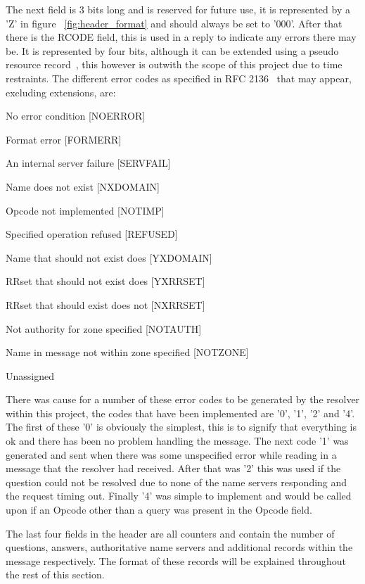 \documentclass{l3proj}
\begin{document}
The next field is 3 bits long and is reserved for future use, it is represented by a 'Z' in figure ~\ref{fig:header_format} and should always be set to '000'. After that there is the RCODE field, this is used in a reply to indicate any errors there may be. It is represented by four bits, although it can be extended using a pseudo resource record~\cite{rfc2671}, this however is outwith the scope of this project due to time restraints. The different error codes as specified in RFC 2136~\cite{rfc2136} that may appear, excluding extensions, are:

\begin{description}[noitemsep]
	\item[0] No error condition [NOERROR]
	\item[1] Format error [FORMERR]
	\item[2] An internal server failure [SERVFAIL]
	\item[3] Name does not exist [NXDOMAIN]
	\item[4] Opcode not implemented [NOTIMP]
	\item[5] Specified operation refused [REFUSED]
	\item[6] Name that should not exist does [YXDOMAIN]
	\item[7] RRset that should not exist does [YXRRSET]
	\item[8] RRset that should exist does not [NXRRSET]
	\item[9] Not authority for zone specified [NOTAUTH]
	\item[10] Name in message not within zone specified [NOTZONE]
	\item[11-15] Unassigned
\end{description}

There was cause for a number of these error codes to be generated by the resolver within this project, the codes that have been implemented are '0', '1', '2' and '4'. The first of these '0' is obviously the simplest, this is to signify that everything is ok and there has been no problem handling the message. The next code '1' was generated and sent when there was some unspecified error while reading in a message that the resolver had received. After that was '2' this was used if the question could not be resolved due to none of the name servers responding and the request timing out. Finally '4' was simple to implement and would be called upon if an Opcode other than a query was present in the Opcode field.

The last four fields in the header are all counters and contain the number of questions, answers, authoritative name servers and additional records within the message respectively. The format of these records will be explained throughout the rest of this section.
\end{document}
